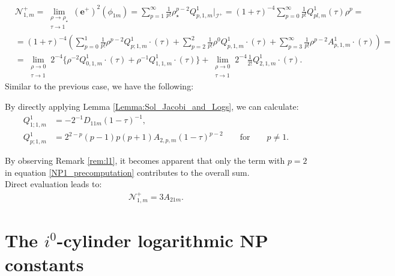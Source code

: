 \begin{align}\label{NP1_precomputation}
  & \mathcal{N}^{+}_{1,m}= \lim_{\substack{\rho \to \rho_{\star} \\ \tau \to 1}} (\boldsymbol{e}^{+})^2(\phi_{1m}) = \sum_{p=1}^{\infty}\frac{1}{p!}\rho_{\star}^{p-2}Q^{1}_{p,1,m}|_{\mathscr{I}^{+}} =  (1+\tau)^{-4} \sum_{p=0}^{\infty} \frac{1}{p !} Q_{p l, m}^{1}(\tau) \rho^{p} = \nonumber \\
  & = (1+\tau)^{-4}\left(\sum_{p=0}^{1} \frac{1}{p !} \rho^{p-2} Q_{p; 1, m}^{1}\cdot(\tau)+\sum_{p=2}^{2} \frac{1}{p !} \rho^{0} Q_{p, 1, m}^{1}\cdot(\tau)+\sum_{p=3}^{\infty} \frac{1}{p !} \rho^{p-2} A_{p, 1, m}^{1}\cdot{(\tau)}\right) = \nonumber \\
  & = \lim _{\substack{\rho \rightarrow 0 \\ \tau \rightarrow 1}} 2^{-4}\big\{\rho^{-2} Q_{0,1, m}^{1}\cdot(\tau)+\rho^{-1} Q_{1,1, m}^{1}\cdot(\tau)\big\}+\lim_{\substack{\rho \rightarrow 0 \\ \tau \rightarrow 1}} 2^{-4} \frac{1}{2 !} Q^{1}_{2, 1, m}\cdot(\tau). 
\end{align}
Similar to the previous case, we have the following:
\begin{remark}\label{rem:l1}
  By directly applying Lemma \ref{Lemma:Sol_Jacobi_and_Logs}, we can calculate: 
 \begin{align}
   Q^{1}_{1;1,m} &=-2^{-1}D_{11m}(1-\tau)^{-1},\\
   Q^{1}_{p;1,m} &=2^{2-p}(p-1)p(p+1)A_{2,p,m}(1-\tau)^{p-2} \qquad
   \text{for}\qquad p\neq 1.
 \end{align}
\end{remark}
\pagebreak
By observing Remark \ref{rem:l1}, it becomes apparent that only the term with $p=2$ in equation \eqref{NP1_precomputation} contributes to the overall sum. \\
Direct evaluation leads to:
\begin{align}
  \mathcal{N}^{+}_{1,m}=3A_{21m}.
\end{align}
\section{The $i^0$-cylinder logarithmic NP constants}
\label{sec:LogarithmicNP_main}

